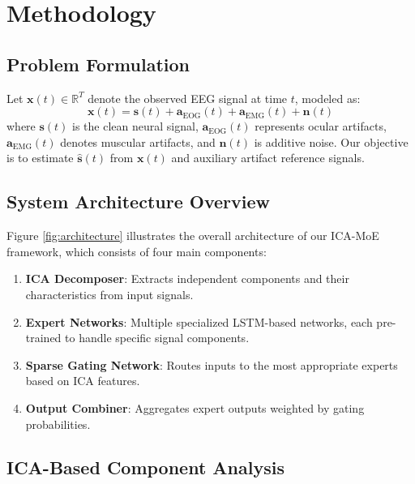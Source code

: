 \documentclass[journal]{IEEEtran}
\begin{document}
\section{Methodology}
\label{sec:methodology}

\subsection{Problem Formulation}

Let $\mathbf{x}(t) \in \mathbb{R}^T$ denote the observed EEG signal at time $t$, modeled as:
\begin{equation}
\mathbf{x}(t) = \mathbf{s}(t) + \mathbf{a}_{\text{EOG}}(t) + \mathbf{a}_{\text{EMG}}(t) + \mathbf{n}(t)
\end{equation}
where $\mathbf{s}(t)$ is the clean neural signal, $\mathbf{a}_{\text{EOG}}(t)$ represents ocular artifacts, $\mathbf{a}_{\text{EMG}}(t)$ denotes muscular artifacts, and $\mathbf{n}(t)$ is additive noise. Our objective is to estimate $\hat{\mathbf{s}}(t)$ from $\mathbf{x}(t)$ and auxiliary artifact reference signals.

\subsection{System Architecture Overview}

Figure \ref{fig:architecture} illustrates the overall architecture of our ICA-MoE framework, which consists of four main components:

\begin{enumerate}
\item \textbf{ICA Decomposer}: Extracts independent components and their characteristics from input signals.
\item \textbf{Expert Networks}: Multiple specialized LSTM-based networks, each pre-trained to handle specific signal components.
\item \textbf{Sparse Gating Network}: Routes inputs to the most appropriate experts based on ICA features.
\item \textbf{Output Combiner}: Aggregates expert outputs weighted by gating probabilities.
\end{enumerate}

\subsection{ICA-Based Component Analysis}
\end{document}
